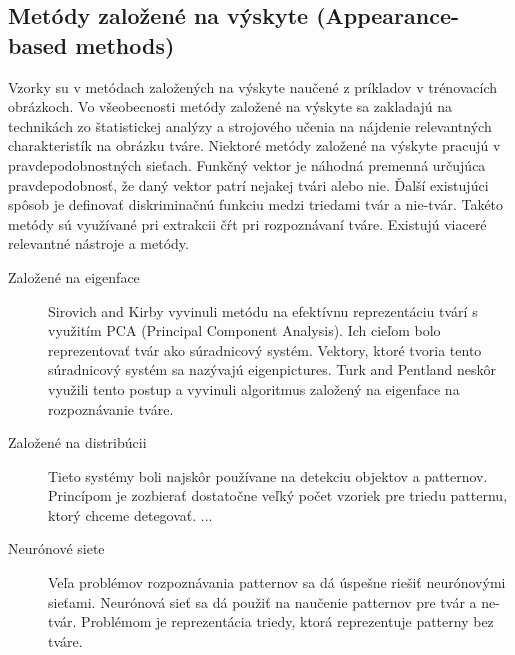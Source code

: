 \subsection{Metódy založené na výskyte (Appearance-based methods)}
Vzorky su v metódach založených na výskyte naučené z príkladov v trénovacích obrázkoch.
Vo všeobecnosti metódy založené na výskyte sa zakladajú na technikách zo štatistickej analýzy a strojového učenia
na nájdenie relevantných charakteristík na obrázku tváre.
Niektoré metódy založené na výskyte pracujú v pravdepodobnostných sieťach.
Funkčný vektor je náhodná premenná určujúca pravdepodobnosť, že daný vektor patrí nejakej tvári alebo nie.
Ďalší existujúci spôsob je definovať diskriminačnú funkciu medzi triedami tvár a nie-tvár.
Takéto metódy sú využívané pri extrakcii čŕt pri rozpoznávaní tváre.
Existujú viaceré relevantné nástroje a metódy.
\begin{description}
  \item[Založené na eigenface] 
  Sirovich and Kirby vyvinuli metódu na efektívnu reprezentáciu tvárí s využitím PCA (Principal Component Analysis).
  Ich cieľom bolo reprezentovať tvár ako súradnicový systém.
  Vektory, ktoré tvoria tento súradnicový systém sa nazývajú eigenpictures. 
  Turk and Pentland neskôr využili tento postup a vyvinuli algoritmus založený na eigenface na rozpoznávanie tváre.
  \item[Založené na distribúcii]
  Tieto systémy boli najskôr používane na detekciu objektov a patternov.
  Princípom je zozbierať dostatočne veľký počet vzoriek pre triedu patternu, ktorý chceme detegovať.
  ...
  \item[Neurónové siete]
  Veľa problémov rozpoznávania patternov sa dá úspešne riešiť neurónovými sieťami.
  Neurónová sieť sa dá použiť na naučenie patternov pre tvár a ne-tvár.
  Problémom je reprezentácia triedy, ktorá reprezentuje patterny bez tváre.

\end{description}

